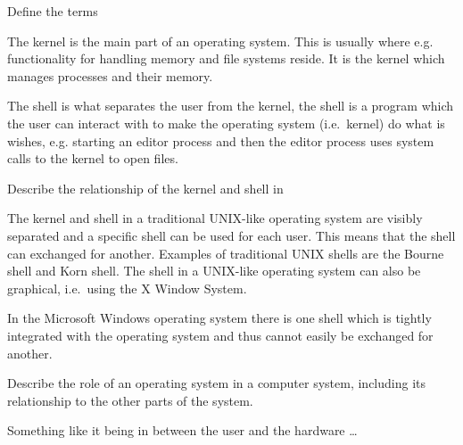\documentclass[a4paper,nocourse]{miunasgn}
\begin{document}
\begin{questions}
	\question\label{q:kernelshell}
	Define the terms
	\begin{solution}
		The kernel is the main part of an operating system.
		This is usually where e.g. functionality for handling memory and file 
		systems reside.
		It is the kernel which manages processes and their memory.

		The shell is what separates the user from the kernel, the shell is 
		a program which the user can interact with to make the operating system 
		(i.e.\ kernel) do what is wishes, e.g. starting an editor process and then 
		the editor process uses system calls to the kernel to open files.
	\end{solution}

	\question\label{q:kernelshellcntd}
	Describe the relationship of the kernel and shell in
	\begin{solution}
		The kernel and shell in a traditional UNIX-like operating system are 
		visibly separated and a specific shell can be used for each user.
		This means that the shell can exchanged for another.
		Examples of traditional UNIX shells are the Bourne shell and Korn shell.
		The shell in a UNIX-like operating system can also be graphical, i.e.\ using 
		the X Window System.

		In the Microsoft Windows operating system there is one shell which is 
		tightly integrated with the operating system and thus cannot easily be 
		exchanged for another.
	\end{solution}

	\question\label{q:os}
	Describe the role of an operating system in a computer system, including its 
	relationship to the other parts of the system.
	\begin{solution}
		Something like it being in between the user and the hardware \dots
	\end{solution}

\end{questions}






\end{document}
